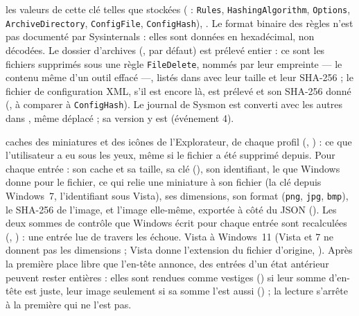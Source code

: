 \documentclass[11pt,a4paper,oneside]{report}
\begin{document}
\begin{description}[style=nextline,leftmargin=1.2em]
        les valeurs de cette clé telles que stockées ( :
        \texttt{Rules}, \texttt{HashingAlgorithm}, \texttt{Options},
        \texttt{ArchiveDirectory}, \texttt{ConfigFile}, \texttt{ConfigHash}),
        . Le format binaire des règles n'est pas documenté
        par Sysinternals : elles sont données en hexadécimal, non décodées.
        Le dossier d'archives (, 
        par défaut) est prélevé entier : ce sont les fichiers supprimés sous
        une règle \texttt{FileDelete}, nommés par leur empreinte — le contenu
        même d'un outil effacé —, listés dans  avec leur
        taille et leur SHA-256 ; le fichier de configuration XML, s'il est
        encore là, est prélevé et son SHA-256 donné (,
        à comparer à \texttt{ConfigHash}). Le journal de Sysmon est converti
        avec les autres dans , même déplacé ; sa
        version y est (événement 4).
  \item[\fichier{thumbcache.json}] caches des miniatures et des icônes de
        l'Explorateur, de chaque profil (,
        ) : ce que l'utilisateur a eu sous les yeux,
        même si le fichier a été supprimé depuis. Pour chaque entrée : son
        cache et sa taille, sa clé (), son identifiant, le
         que Windows donne pour le fichier, ce qui
        relie une miniature à son fichier (la clé depuis Windows~7,
        l'identifiant sous Vista), ses dimensions, son format (\texttt{png},
        \texttt{jpg}, \texttt{bmp}), le SHA-256 de l'image, et l'image
        elle-même, exportée à côté du JSON
        ().
        Les deux sommes de contrôle que Windows écrit pour chaque entrée sont
        recalculées (, ) :
        une entrée lue de travers les échoue. Vista à Windows~11 (Vista et 7
        ne donnent pas les dimensions ; Vista donne l'extension du fichier
        d'origine, ). Après la première place libre
        que l'en-tête annonce, des entrées d'un état antérieur peuvent rester
        entières : elles sont rendues comme vestiges () si leur
        somme d'en-tête est juste, leur image seulement si sa somme l'est aussi
        () ; la lecture
        s'arrête à la première qui ne l'est pas.

\end{description}
\end{document}

